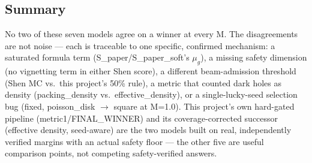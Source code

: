 \documentclass[10pt]{article}
\begin{document}
\subsection*{Summary}
No two of these seven models agree on a winner at every M. The disagreements are not noise —
each is traceable to one specific, confirmed mechanism: a saturated formula term (S\_paper/S\_paper\_soft's
$\mu_g$), a missing safety dimension (no vignetting term in either Shen score), a different beam-admission
threshold (Shen MC vs.\ this project's 50\% rule), a metric that counted dark holes as density
(packing\_density vs.\ effective\_density), or a single-lucky-seed selection bug (fixed, poisson\_disk
$\rightarrow$ square at M=1.0). This project's own hard-gated pipeline (metric1/FINAL\_WINNER) and its
coverage-corrected successor (effective density, seed-aware) are the two models built on real,
independently verified margins with an actual safety floor — the other five are useful comparison
points, not competing safety-verified answers.
\end{document}
